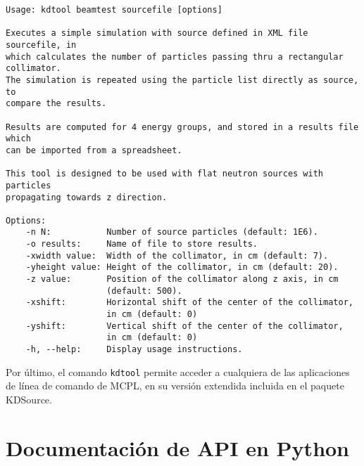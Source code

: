 \begin{lstlisting}[label={lst:beamtest}, caption=Instrucciones de uso del comando \texttt{kdtool beamtest} (output de ``\texttt{kdtool beamtest --help}'').]
Usage: kdtool beamtest sourcefile [options]

Executes a simple simulation with source defined in XML file sourcefile, in
which calculates the number of particles passing thru a rectangular collimator.
The simulation is repeated using the particle list directly as source, to
compare the results.

Results are computed for 4 energy groups, and stored in a results file which
can be imported from a spreadsheet.

This tool is designed to be used with flat neutron sources with particles
propagating towards z direction.

Options:
	-n N:           Number of source particles (default: 1E6).
	-o results:     Name of file to store results.
	-xwidth value:  Width of the collimator, in cm (default: 7).
	-yheight value: Height of the collimator, in cm (default: 20).
	-z value:       Position of the collimator along z axis, in cm
	                (default: 500).
	-xshift:        Horizontal shift of the center of the collimator,
	                in cm (default: 0)
	-yshift:        Vertical shift of the center of the collimator,
	                in cm (default: 0)
	-h, --help:     Display usage instructions.
\end{lstlisting}

Por último, el comando \verb|kdtool| permite acceder a cualquiera de las aplicaciones de línea de comando de MCPL, en su versión extendida incluida en el paquete KDSource.



\section{Documentación de API en Python}
\label{ap:Python}

